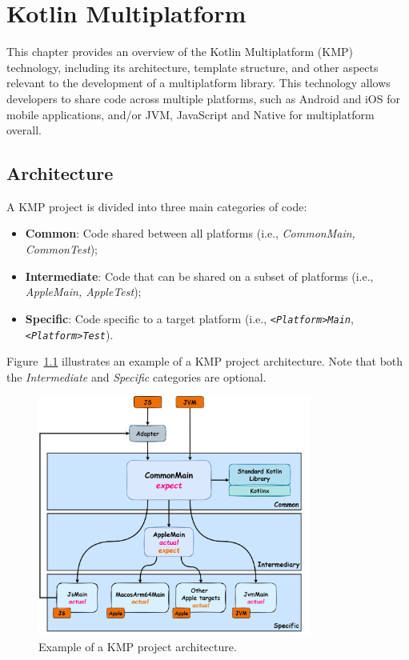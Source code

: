 \chapter{Kotlin Multiplatform}\label{ch:kotlin-multiplatform}

This chapter provides an overview of the Kotlin Multiplatform (KMP) technology, including its architecture, template structure, and other aspects relevant to the development of a multiplatform library.
This technology allows developers to share code across multiple platforms, such as Android and iOS for mobile applications, and/or JVM, JavaScript and Native for multiplatform overall.


\section{Architecture}\label{sec:architecture}

A KMP project is divided into three main categories of code:

\begin{itemize}
    \item \textbf{Common}: Code shared between all platforms (i.e., \textit{CommonMain, CommonTest});
    \item \textbf{Intermediate}: Code that can be shared on a subset of platforms (i.e., \textit{AppleMain, AppleTest});
    \item \textbf{Specific}: Code specific to a target platform (i.e., \texttt{\textit{<Platform>Main}}, \texttt{\textit{<Platform>Test}}).
\end{itemize}

Figure~\ref{fig:kmp-architecture} illustrates an example of a KMP project architecture.
Note that both the \textit{Intermediate} and \textit{Specific} categories are optional.

\begin{figure}[!htb]
    \centering
    \includegraphics[width=0.8\textwidth]{../figures/02_kmp-architecture}
    \caption{Example of a KMP project architecture.}
    \label{fig:kmp-architecture}
\end{figure}

